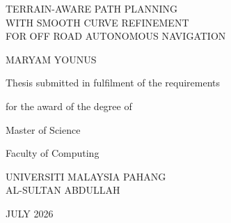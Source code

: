 \begin{titlepage}

\begin{center}
\bigskip
\end{center}

\begin{center}
\bigskip
\end{center}

\begin{center}
\bigskip
\end{center}

\begin{center}
TERRAIN-AWARE PATH PLANNING\\
WITH SMOOTH CURVE REFINEMENT\\
FOR OFF ROAD AUTONOMOUS NAVIGATION\par\vskip3cm

MARYAM YOUNUS\par\vskip3cm

Thesis submitted in fulfilment of the requirements\par
for the award of the degree of\par
Master of Science\par
\vskip3cm

Faculty of Computing\par
UNIVERSITI MALAYSIA PAHANG\\
AL-SULTAN ABDULLAH\par
\vskip3cm

JULY 2026
\end{center}
\end{titlepage}